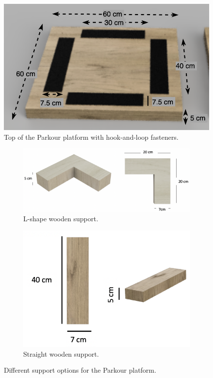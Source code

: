 {\begin{figure}[htb]
  \centering
  \includegraphics[width=.45\textwidth]{img/parkour/top_fasteners}
  \caption{Top of the Parkour platform with hook-and-loop fasteners.}
  \label{fig:parkour-top-platform-with-hook-and-loop}
\end{figure}

\begin{figure}[htb]
  \begin{subfigure}{.45\textwidth}
    \centering
    \includegraphics[width=\textwidth]{img/parkour/option1_support}
    \caption{L-shape wooden support.}
    \label{fig:parkour-option1-support}
  \end{subfigure}
  \hfill
  \begin{subfigure}{.45\textwidth}
    \centering
    \includegraphics[width=\textwidth]{img/parkour/option2_support}
    \caption{Straight wooden support.}
    \label{fig:parkour-option2-support}
  \end{subfigure}
  \caption{Different support options for the Parkour platform.}
\end{figure}

}
